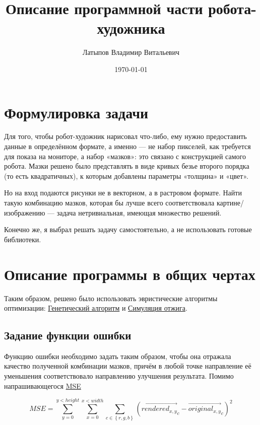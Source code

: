 \documentclass[11pt]{article}
\title{Описание программной части робота-художника}
\author{Латыпов Владимир Витальевич}
\date{\today}
\begin{document}
    \maketitle
    \newpage
    \tableofcontents
    \newpage

    \section{Формулировка задачи}

    Для того, чтобы робот-художник нарисовал что-либо, ему нужно предоставить данные в определённом формате, а именно — не набор пикселей,
    как требуется для показа на мониторе, а набор «мазков»: это связано с конструкцией самого робота.
    Мазки решено было представлять в виде кривых безье второго порядка (то есть квадратичных), к которым добавлены параметры «толщина» и «цвет».

    Но на вход подаются рисунки не в векторном, а в растровом формате.
    Найти такую комбинацию мазков, которая бы лучше всего соответствовала картине/изображению — задача нетривиальная, имеющая множество решений.

    Конечно же, я выбрал решать задачу самостоятельно, а не использовать готовые библиотеки.

    \section{Описание программы в общих чертах}\label{sec:approx_description}
    Таким образом, решено было использовать эвристические алгоритмы оптимизации:
    \href{https://en.wikipedia.org/wiki/Simulated_annealing}{Генетический алгоритм} и \href{https://en.wikipedia.org/wiki/Simulated_annealing}{Симуляция отжига}.

    \subsection{Задание функции ошибки}
    Функцию ошибки необходимо задать таким образом, чтобы она отражала качество полученной комбинации мазков,
    причём в любой точке направление её уменьшения соответствовало направлению улучшения результата.
    Помимо напрашивающегося \href{https://en.wikipedia.org/wiki/Mean_squared_error}{MSE}

    \begin{equation}\label{eq:equation}
        MSE = \sum_{y = 0}^{y < height} { \sum_{x = 0}^{x < width} { \sum_{c \in  \left\{ r, g, b \right\} } { \left( {\overrightarrow {rendered_{x, y}}}_c - {\overrightarrow{original_{x, y}}}_c\right)^2 }}}
    \end{equation}
\end{document}
